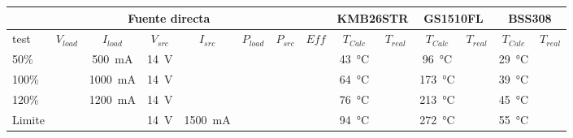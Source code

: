 \begin{landscape}
    \begin{table}[H]
        \centering
        \renewcommand\theadfont{\bfseries}
        \setlength{\tabcolsep}{10pt}
        \renewcommand{\arraystretch}{1.5}
        \begin{tabular}{|l|c|c|c|c|c|c|c|c|c|c|c|c|c|}
            \hline
            \multicolumn{8}{|c|}{Fuente directa}    & \multicolumn{2}{|c|}{KMB26STR} & \multicolumn{2}{|c|}{GS1510FL} & \multicolumn{2}{|c|}{BSS308}                                                                                                                                                                   \\ \hline
            test                                    & $V_{load}$                     & $I_{load}$                     & $V_{src}$                      & $I_{src}$                & $P_{load}$ & $P_{src}$ & $Eff$ & $T_{Calc}$        & $T_{real}$ & $T_{Calc}$         & $T_{real}$ & $T_{Calc}$        & $T_{real}$ \\ \hline
            50\%                                    &                                & \SI{500}{\milli\ampere}        & \SI{14}{\volt}                 &                          &            &           &       & \SI{43}{\celsius} &            & \SI{96}{\celsius}  &            & \SI{29}{\celsius} &            \\ \hline
            100\%                                   &                                & \SI{1000}{\milli\ampere}       & \SI{14}{\volt}                 &                          &            &           &       & \SI{64}{\celsius} &            & \SI{173}{\celsius} &            & \SI{39}{\celsius} &            \\ \hline
            120\%                                   &                                & \SI{1200}{\milli\ampere}       & \SI{14}{\volt}                 &                          &            &           &       & \SI{76}{\celsius} &            & \SI{213}{\celsius} &            & \SI{45}{\celsius} &            \\ \hline
            Limite                                  &                                &                                & \SI{14}{\volt}                 & \SI{1500}{\milli\ampere} &            &           &       & \SI{94}{\celsius} &            & \SI{272}{\celsius} &            & \SI{55}{\celsius} &            \\
            \hline


\end{tabular}
\end{table}
\end{landscape}
